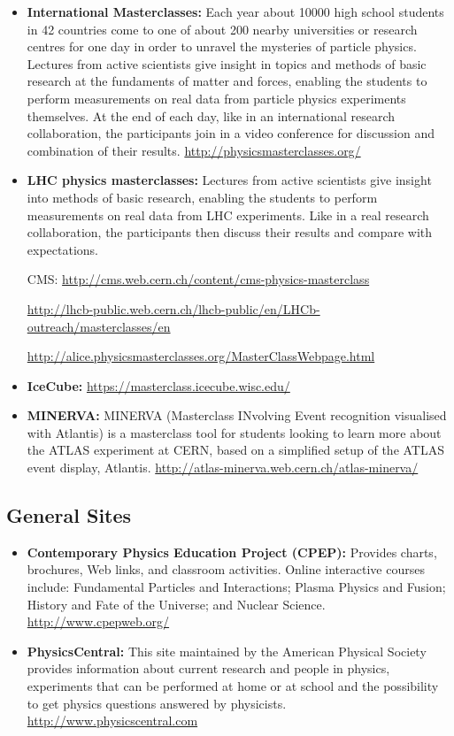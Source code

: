 \begin{itemize}
\item
  \textbf{International Masterclasses:} Each year about 10000 high
  school students in 42 countries come to one of about 200 nearby
  universities or research centres for one day in order to unravel the
  mysteries of particle physics. Lectures from active scientists give
  insight in topics and methods of basic research at the fundaments of
  matter and forces, enabling the students to perform measurements on
  real data from particle physics experiments themselves. At the end of
  each day, like in an international research collaboration, the
  participants join in a video conference for discussion and combination
  of their results. \url{http://physicsmasterclasses.org/}
\item
  \textbf{LHC physics masterclasses:} Lectures from active scientists
  give insight into methods of basic research, enabling the students to
  perform measurements on real data from LHC experiments. Like in a real
  research collaboration, the participants then discuss their results
  and compare with expectations.

  CMS: \url{http://cms.web.cern.ch/content/cms-physics-masterclass}

  \url{http://lhcb-public.web.cern.ch/lhcb-public/en/LHCb-outreach/masterclasses/en}

  \url{http://alice.physicsmasterclasses.org/MasterClassWebpage.html}
\item
  \textbf{IceCube:} \url{https://masterclass.icecube.wisc.edu/}
\item
  \textbf{MINERVA:} MINERVA (Masterclass INvolving Event recognition
  visualised with Atlantis) is a masterclass tool for students looking
  to learn more about the ATLAS experiment at CERN, based on a
  simplified setup of the ATLAS event display, Atlantis.
  \url{http://atlas-minerva.web.cern.ch/atlas-minerva/}
\end{itemize}

\subsection{General Sites}\label{general-sites}

\begin{itemize}
\item
  \textbf{Contemporary Physics Education Project (CPEP):} Provides
  charts, brochures, Web links, and classroom activities. Online
  interactive courses include: Fundamental Particles and Interactions;
  Plasma Physics and Fusion; History and Fate of the Universe; and
  Nuclear Science. \url{http://www.cpepweb.org/}
\item
  \textbf{PhysicsCentral:} This site maintained by the American Physical
  Society provides information about current research and people in
  physics, experiments that can be performed at home or at school and
  the possibility to get physics questions answered by physicists.
  \url{http://www.physicscentral.com}
\end{itemize}

